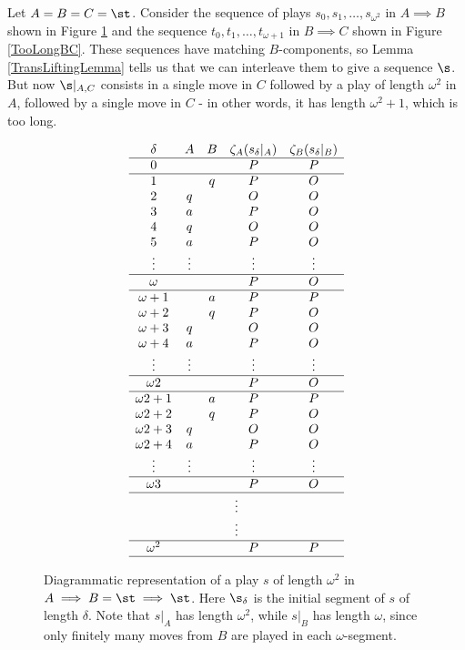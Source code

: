 \documentclass[11pt]{article} %
\begin{document}
Let $A=B=C=\st$.  Consider the sequence of plays $s_0,s_1,\dots,s_{\omega^2}$ in $A\implies B$ shown in Figure \ref{TooLongAB} and the sequence $t_0,t_1,\dots,t_{\omega+1}$ in $B\implies C$ shown in Figure \ref{TooLongBC}.  These sequences have matching $B$-components, so Lemma \ref{TransLiftingLemma} tells us that we can interleave them to give a sequence $\s$.  But now $\s\vert_{A,C}$ consists in a single move in $C$ followed by a play of length $\omega^2$ in $A$, followed by a single move in $C$ - in other words, it has length $\omega^2+1$, which is too long.  
\begin{figure}[!ht]
  \[
    \begin{array}{ccccc}
      \delta & A & B & \zeta_A(s_\delta\vert_A) & \zeta_B(s_\delta\vert_B) \\
      \hline
      0 & & & P & P \\
      \hline
      1 & & q & P & O \\
      2 & q & & O & O \\
      3 & a & & P & O \\
      4 & q & & O & O \\
      5 & a & & P & O \\
      \vdots & \vdots & & \vdots & \vdots \\
      \hline
      \omega & & & P & O \\
      \hline
      \omega+1 & & a & P & P \\
      \omega+2 & & q & P & O \\
      \omega+3 & q & & O & O \\
      \omega+4 & a & & P & O \\
      \vdots & \vdots & & \vdots & \vdots \\
      \hline
      \omega2 & & & P & O \\
      \hline
      \omega2+1 & & a & P & P \\
      \omega2+2 & & q & P & O \\
      \omega2+3 & q & & O & O \\
      \omega2+4 & a & & P & O \\
      \vdots & \vdots & & \vdots & \vdots \\
      \hline
      \omega3 & & & P & O \\
      \hline
      \multicolumn{5}{c}{\vdots}\\
      \multicolumn{5}{c}{\vdots}\\
      \hline
      \omega^2 & & & P & P \\
      \hline
    \end{array}
    \]
  \caption{Diagrammatic representation of a play $s$ of length $\omega^2$ in $A\implies B=\st\implies \st$.  Here $\s_\delta$ is the initial segment of $s$ of length $\delta$.  Note that $s\vert_A$ has length $\omega^2$, while $s\vert_B$ has length $\omega$, since only finitely many moves from $B$ are played in each $\omega$-segment.}
  \label{TooLongAB}
\end{figure}
\end{document}
